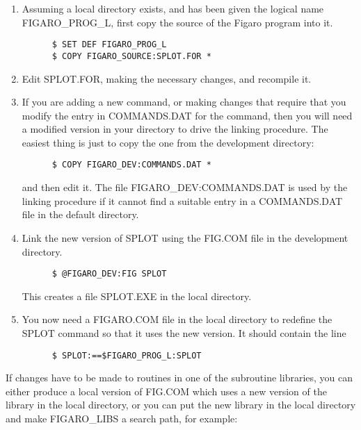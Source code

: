 \begin{enumerate}

\item Assuming a local directory exists, and has been given the logical 
name FIGARO\_PROG\_L, first copy the source of the Figaro program into it.

\begin{verbatim}
      $ SET DEF FIGARO_PROG_L
      $ COPY FIGARO_SOURCE:SPLOT.FOR *
\end{verbatim}

\item Edit SPLOT.FOR, making the necessary changes, and recompile it.

\item If you are adding a new command, or making changes that require that 
you modify the entry in COMMANDS.DAT for the command, then you will need a
modified version in your directory to drive the linking procedure.  The 
easiest thing is just to copy the one from the development directory:

\begin{verbatim}
      $ COPY FIGARO_DEV:COMMANDS.DAT *
\end{verbatim}

and then edit it. The file FIGARO\_DEV:COMMANDS.DAT is used by the linking 
procedure if it cannot find a suitable entry in a COMMANDS.DAT file in the
default directory.

\item Link the new version of SPLOT using the FIG.COM file in the
development directory.

\begin{verbatim}
      $ @FIGARO_DEV:FIG SPLOT
\end{verbatim}

This creates a file SPLOT.EXE in the local directory.

\item You now need a FIGARO.COM file in the local directory to redefine 
the SPLOT command so that it uses the new version. It should contain the line

\begin{verbatim}
      $ SPLOT:==$FIGARO_PROG_L:SPLOT
\end{verbatim}

\end{enumerate}

If changes have to be made to routines in one of the subroutine libraries, you 
can either produce a local version of FIG.COM which uses a new version of the
library in the local directory, or you can put the new library in the local
directory and make FIGARO\_LIBS a search path, for example:

